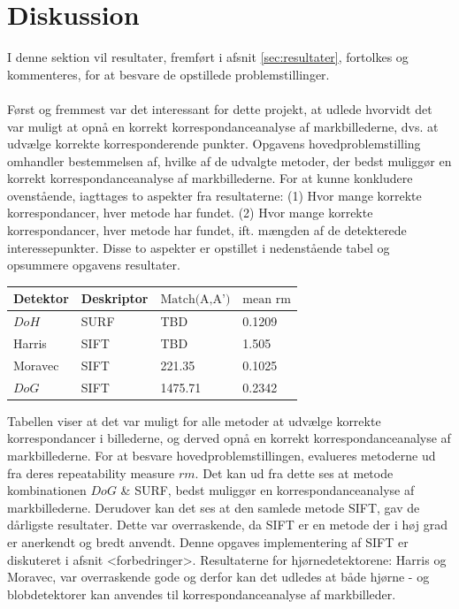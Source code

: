 \chapter{Diskussion}
I denne sektion vil resultater, fremført i afsnit \ref{sec:resultater}, fortolkes og kommenteres, for at besvare de opstillede problemstillinger. \\ \\
Først og fremmest var det interessant for dette projekt, at udlede hvorvidt det var muligt at opnå en korrekt korrespondanceanalyse af markbillederne, dvs. at udvælge korrekte korresponderende punkter. Opgavens hovedproblemstilling omhandler bestemmelsen af, hvilke af de udvalgte metoder, der bedst muliggør en korrekt korrespondanceanalyse af markbillederne. For at kunne konkludere ovenstående, iagttages to aspekter fra resultaterne: (1) Hvor mange korrekte korrespondancer, hver metode har fundet. (2) Hvor mange korrekte korrespondancer, hver metode har fundet, ift. mængden af de detekterede interessepunkter. Disse to aspekter er opstillet i nedenstående tabel og opsummere opgavens resultater.
\begin{center}
    \begin{tabular}{ | l | l | l | l |}
    \hline
    Detektor & Deskriptor & $\text{Match(A,A')}$ & $\text{mean rm}$ \\ \hline
    $DoH$ & SURF & TBD & 0.1209 \\ \hline  
    Harris & SIFT & TBD & 1.505 \\ \hline    
    Moravec & SIFT & 221.35 & 0.1025 \\ \hline    
    $DoG$ & SIFT & 1475.71 & 0.2342 \\ \hline         
    \end{tabular}
    \label{table:tab}
\end{center}
Tabellen viser at det var muligt for alle metoder at udvælge korrekte korrespondancer i billederne, og derved opnå en korrekt korrespondanceanalyse af markbillederne. For at besvare hovedproblemstillingen, evalueres metoderne ud fra deres repeatability measure $rm$. Det kan ud fra dette ses at metode kombinationen $DoG$ \& SURF, bedst muliggør en korrespondanceanalyse af markbillederne. Derudover kan det ses at den samlede metode SIFT, gav de dårligste resultater. Dette var overraskende, da SIFT er en metode der i høj grad er anerkendt og bredt anvendt. Denne opgaves implementering af SIFT er diskuteret i afsnit <forbedringer>. Resultaterne for hjørnedetektorene: Harris og Moravec, var overraskende gode og derfor kan det udledes at både hjørne - og blobdetektorer kan anvendes til korrespondanceanalyse af markbilleder.
